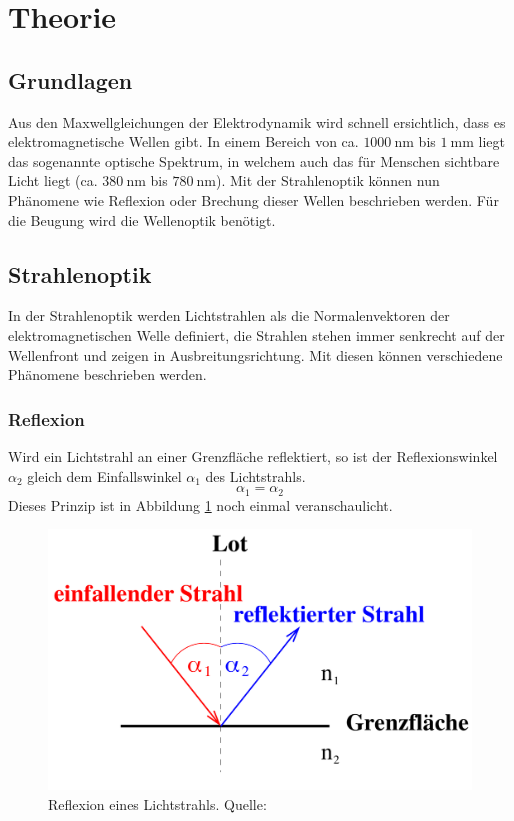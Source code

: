 \section{Theorie}
\label{sec:Theorie}

\subsection{Grundlagen}
\label{sec:grundlagen}
Aus den Maxwellgleichungen der Elektrodynamik wird schnell ersichtlich, dass es elektromagnetische Wellen
gibt. In einem Bereich von ca. $\SI{1000}{\nano\metre}$ bis $\SI{1}{\milli\metre}$ liegt das sogenannte
optische Spektrum, in welchem auch das für Menschen sichtbare Licht liegt (ca. $\SI{380}{\nano\metre}$
bis $\SI{780}{\nano\metre}$). Mit der Strahlenoptik \label{sec:strahlen} können nun Phänomene wie Reflexion oder Brechung
dieser Wellen beschrieben werden. Für die Beugung wird die Wellenoptik \label{sec:welle} benötigt.
\subsection{Strahlenoptik}
In der Strahlenoptik werden Lichtstrahlen als die Normalenvektoren der elektromagnetischen Welle
definiert, die Strahlen stehen immer senkrecht auf der Wellenfront und zeigen in Ausbreitungsrichtung.
Mit diesen können verschiedene Phänomene beschrieben werden.

\subsubsection*{Reflexion}
\label{sec:reflexion}
Wird ein Lichtstrahl an einer Grenzfläche reflektiert, so ist der Reflexionswinkel $\alpha_2$ gleich dem
Einfallswinkel $\alpha_1$ des Lichtstrahls.
\begin{equation}
    \alpha_1=\alpha_2
    \label{eqn:reflexion}
\end{equation}
Dieses Prinzip ist in Abbildung \ref{fig:reflexion} noch einmal veranschaulicht.
\begin{figure}[H]
    \centering
    \includegraphics[scale = 0.3]{pictures/Reflexion.png}
    \caption{Reflexion eines Lichtstrahls. Quelle: \cite{AP01}}
    \label{fig:reflexion}
\end{figure}

